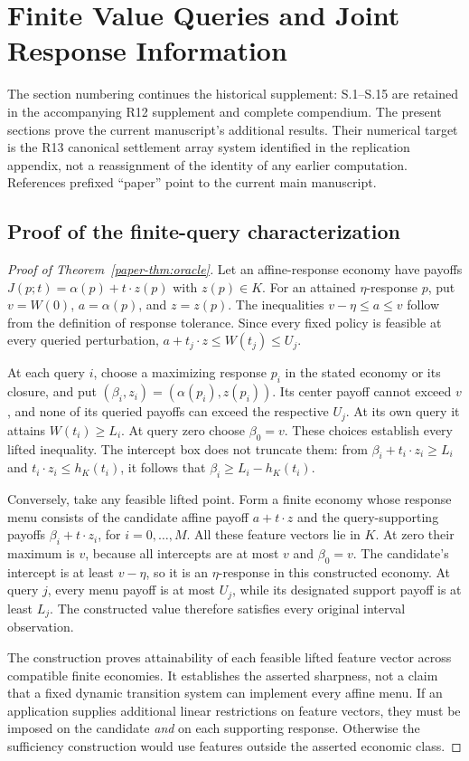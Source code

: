 \section{Finite Value Queries and Joint Response Information}
The section numbering continues the historical supplement: S.1--S.15 are retained in the accompanying R12 supplement and complete compendium. The present sections prove the current manuscript's additional results. Their numerical target is the R13 canonical settlement array system identified in the replication appendix, not a reassignment of the identity of any earlier computation. References prefixed ``paper'' point to the current main manuscript.

\subsection{Proof of the finite-query characterization}
\begin{proof}[Proof of Theorem~\ref{paper-thm:oracle}]
Let an affine-response economy have payoffs $J(p;t)=\alpha(p)+t\cdot z(p)$ with $z(p)\in K$. For an attained $\eta$-response $p$, put $v=W(0)$, $a=\alpha(p)$, and $z=z(p)$. The inequalities $v-\eta\leq a\leq v$ follow from the definition of response tolerance. Since every fixed policy is feasible at every queried perturbation, $a+t_j\cdot z\leq W(t_j)\leq U_j$.

At each query $i$, choose a maximizing response $p_i$ in the stated economy or its closure, and put $(\beta_i,z_i)=(\alpha(p_i),z(p_i))$. Its center payoff cannot exceed $v$, and none of its queried payoffs can exceed the respective $U_j$. At its own query it attains $W(t_i)\geq L_i$. At query zero choose $\beta_0=v$. These choices establish every lifted inequality. The intercept box does not truncate them: from $\beta_i+t_i\cdot z_i\geq L_i$ and $t_i\cdot z_i\leq h_K(t_i)$, it follows that $\beta_i\geq L_i-h_K(t_i)$.

Conversely, take any feasible lifted point. Form a finite economy whose response menu consists of the candidate affine payoff $a+t\cdot z$ and the query-supporting payoffs $\beta_i+t\cdot z_i$, for $i=0,\ldots,M$. All these feature vectors lie in $K$. At zero their maximum is $v$, because all intercepts are at most $v$ and $\beta_0=v$. The candidate's intercept is at least $v-\eta$, so it is an $\eta$-response in this constructed economy. At query $j$, every menu payoff is at most $U_j$, while its designated support payoff is at least $L_j$. The constructed value therefore satisfies every original interval observation.

The construction proves attainability of each feasible lifted feature vector across compatible finite economies. It establishes the asserted sharpness, not a claim that a fixed dynamic transition system can implement every affine menu. If an application supplies additional linear restrictions on feature vectors, they must be imposed on the candidate \emph{and} on each supporting response. Otherwise the sufficiency construction would use features outside the asserted economic class.
\end{proof}

